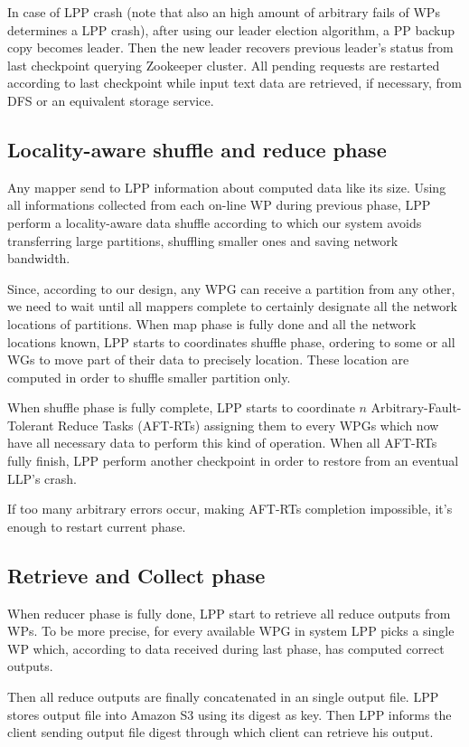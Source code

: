 \documentclass[sigchi]{acmart}
\begin{document}
In case of LPP crash (note that also an high amount of arbitrary fails of WPs determines a LPP crash), after using our leader election algorithm, a PP backup copy becomes leader. Then the new leader recovers previous leader's status from last checkpoint querying Zookeeper cluster. All pending requests are restarted according to last checkpoint while input text data are retrieved, if necessary, from DFS or an equivalent storage service. 

\subsection{Locality-aware shuffle and reduce phase}

Any mapper send to LPP information about computed data like its size. Using all informations collected from each on-line WP during previous phase, LPP perform a locality-aware data shuffle according to which our system avoids transferring large partitions, shuffling smaller ones and saving network bandwidth.

Since, according to our design, any WPG can receive a partition from any other, we need to wait until all mappers complete to certainly designate all the network locations of partitions. When map phase is fully done and all the network locations known, LPP starts to coordinates shuffle phase, ordering to some or all WGs to move part of their data to precisely location. These location are computed in order to shuffle smaller partition only. 

When shuffle phase is fully complete, LPP starts to coordinate $n$ Arbitrary-Fault-Tolerant Reduce Tasks (AFT-RTs) assigning them to every WPGs which now have all necessary data to perform this kind of operation. When all AFT-RTs fully finish, LPP perform another checkpoint in order to restore from an eventual LLP's crash.

If too many arbitrary errors occur, making AFT-RTs completion impossible, it's enough to restart current phase.

\subsection{Retrieve and Collect phase}

When reducer phase is fully done, LPP start to retrieve all reduce outputs from WPs. To be more precise, for every available WPG in system LPP picks a single WP which, according to data received during last phase, has computed correct outputs.

Then all reduce outputs are finally concatenated in an single output file. LPP stores output file into Amazon S3 using its digest as key. Then LPP informs the client sending output file digest through which client can retrieve his output.




\appendix
\end{document}
